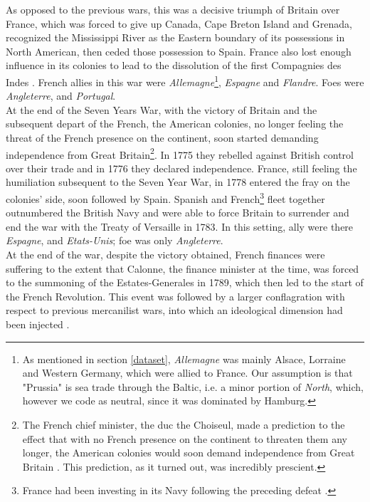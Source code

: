 \documentclass[12pt,a4paper,notitlepage,english]{article}
\begin{document}
As opposed to the previous wars, this was a decisive triumph of Britain over France, which was forced to give up Canada, Cape Breton Island and Grenada, recognized the Mississippi River as the Eastern boundary of its possessions in North American, then ceded those possession to Spain.
France also lost enough influence in its colonies to lead to the dissolution of the first Compagnies des Indes \citep{riley_seven_1986}.
French allies in this war were \textit{Allemagne}\footnote{As mentioned in section \ref{dataset}, \textit{Allemagne} was mainly Alsace, Lorraine and Western Germany, which were allied to France.
Our assumption is that "Prussia" is sea trade through the Baltic, i.e. a minor portion of \textit{North}, which, however we code as neutral, since it was dominated by Hamburg.}, \textit{Espagne} and \textit{Flandre}.
Foes were \textit{Angleterre}, and \textit{Portugal}. \\
At the end of the Seven Years War, with the victory of Britain and the subsequent depart of the French, the American colonies, no longer feeling the threat of the French presence on the continent, soon started demanding independence from Great Britain\footnote{The French chief minister, the duc the Choiseul, made a prediction to the effect that with no French presence on the continent to threaten them any longer, the American colonies would soon demand independence from Great Britain \citep{findlay2009power}.
This prediction, as it turned out, was incredibly prescient.}.
In 1775 they rebelled against British control over their trade and in 1776 they declared independence.
France, still feeling the humiliation subsequent to the Seven Year War, in 1778 entered the fray on the colonies' side, soon followed by Spain.
Spanish and French\footnote{France had been investing in its Navy following the preceding defeat \citep{findlay2009power}.} fleet together outnumbered the British Navy and were able to force Britain to surrender and end the war with the Treaty of Versaille in 1783.
In this setting, ally were there \textit{Espagne}, and \textit{Etats-Unis}; foe was only \textit{Angleterre}. \\
At the end of the war, despite the victory obtained, French finances were suffering to the extent that Calonne, the finance minister at the time, was forced to the summoning of the Estates-Generales in 1789, which then led to the start of the French Revolution.
This event was followed by a larger conflagration with respect to previous mercanilist wars, into which an ideological dimension had been injected \citep{o2006worldwide}.
\end{document}
